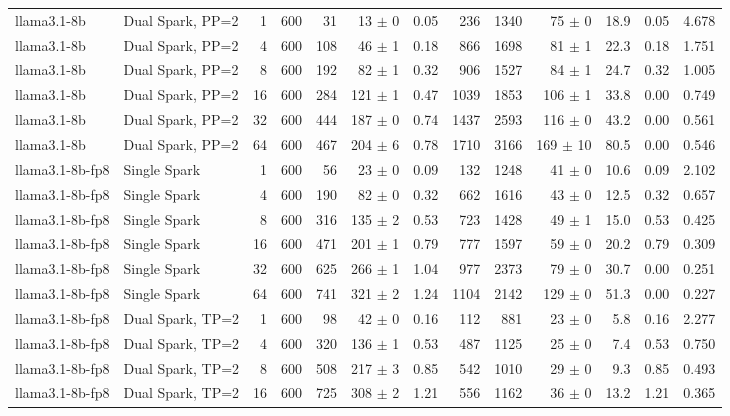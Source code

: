\begin{tabular}{l l r r r r r r r r r r r}
\addlinespace
llama3.1-8b & Dual Spark, PP=2 & 1 & 600 & 31\rlap{$^\dagger$} & 13 $\pm$ 0 & 0.05 & 236 & 1340 & 75 $\pm$ 0 & 18.9 & 0.05 & 4.678 \\
llama3.1-8b & Dual Spark, PP=2 & 4 & 600 & 108 & 46 $\pm$ 1 & 0.18 & 866 & 1698 & 81 $\pm$ 1 & 22.3 & 0.18 & 1.751 \\
llama3.1-8b & Dual Spark, PP=2 & 8 & 600 & 192 & 82 $\pm$ 1 & 0.32 & 906 & 1527 & 84 $\pm$ 1 & 24.7 & 0.32 & 1.005 \\
llama3.1-8b & Dual Spark, PP=2 & 16 & 600 & 284 & 121 $\pm$ 1 & 0.47 & 1039 & 1853 & 106 $\pm$ 1 & 33.8 & 0.00 & 0.749 \\
llama3.1-8b & Dual Spark, PP=2 & 32 & 600 & 444 & 187 $\pm$ 0 & 0.74 & 1437 & 2593 & 116 $\pm$ 0 & 43.2 & 0.00 & 0.561 \\
llama3.1-8b & Dual Spark, PP=2 & 64 & 600 & 467 & 204 $\pm$ 6 & 0.78 & 1710 & 3166 & 169 $\pm$ 10 & 80.5 & 0.00 & 0.546 \\
\addlinespace
llama3.1-8b-fp8 & Single Spark & 1 & 600 & 56\rlap{$^\dagger$} & 23 $\pm$ 0 & 0.09 & 132 & 1248 & 41 $\pm$ 0 & 10.6 & 0.09 & 2.102 \\
llama3.1-8b-fp8 & Single Spark & 4 & 600 & 190 & 82 $\pm$ 0 & 0.32 & 662 & 1616 & 43 $\pm$ 0 & 12.5 & 0.32 & 0.657 \\
llama3.1-8b-fp8 & Single Spark & 8 & 600 & 316 & 135 $\pm$ 2 & 0.53 & 723 & 1428 & 49 $\pm$ 1 & 15.0 & 0.53 & 0.425 \\
llama3.1-8b-fp8 & Single Spark & 16 & 600 & 471 & 201 $\pm$ 1 & 0.79 & 777 & 1597 & 59 $\pm$ 0 & 20.2 & 0.79 & 0.309 \\
llama3.1-8b-fp8 & Single Spark & 32 & 600 & 625 & 266 $\pm$ 1 & 1.04 & 977 & 2373 & 79 $\pm$ 0 & 30.7 & 0.00 & 0.251 \\
llama3.1-8b-fp8 & Single Spark & 64 & 600 & 741 & 321 $\pm$ 2 & 1.24 & 1104 & 2142 & 129 $\pm$ 0 & 51.3 & 0.00 & 0.227 \\
\addlinespace
llama3.1-8b-fp8 & Dual Spark, TP=2 & 1 & 600 & 98\rlap{$^\dagger$} & 42 $\pm$ 0 & 0.16 & 112 & 881 & 23 $\pm$ 0 & 5.8 & 0.16 & 2.277 \\
llama3.1-8b-fp8 & Dual Spark, TP=2 & 4 & 600 & 320 & 136 $\pm$ 1 & 0.53 & 487 & 1125 & 25 $\pm$ 0 & 7.4 & 0.53 & 0.750 \\
llama3.1-8b-fp8 & Dual Spark, TP=2 & 8 & 600 & 508 & 217 $\pm$ 3 & 0.85 & 542 & 1010 & 29 $\pm$ 0 & 9.3 & 0.85 & 0.493 \\
llama3.1-8b-fp8 & Dual Spark, TP=2 & 16 & 600 & 725 & 308 $\pm$ 2 & 1.21 & 556 & 1162 & 36 $\pm$ 0 & 13.2 & 1.21 & 0.365 \\

\end{tabular}
